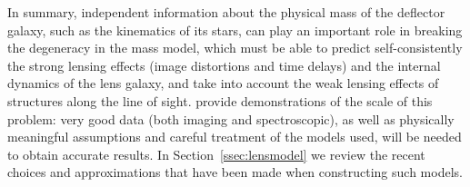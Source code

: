 In summary, independent information about the physical mass of the deflector
galaxy, such as the kinematics of its stars, can play an important role
in breaking the degeneracy in the mass model, which must be able to
predict self-consistently the strong lensing effects (image distortions and time
delays) and the internal dynamics of the lens galaxy, and take into
account the weak lensing effects of structures along the line of sight.
\citet{S+S13} provide demonstrations of the scale of this problem: very
good data (both imaging and spectroscopic), as well as physically
meaningful assumptions and careful treatment of the models used, will
be needed to obtain accurate results.  In Section~\ref{ssec:lensmodel}
we review the recent choices and approximations that have been made
when constructing such models.


